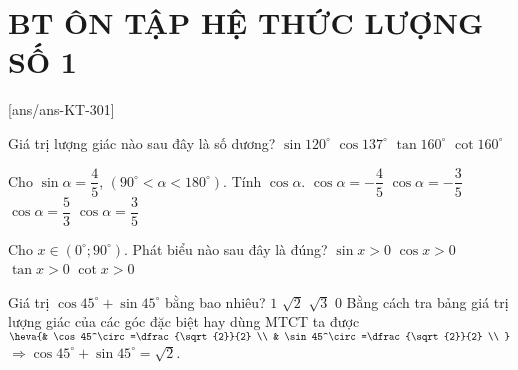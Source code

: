 \section*{BT ÔN TẬP HỆ THỨC LƯỢNG SỐ 1}
\setcounter{ex}{0}\setcounter{ex}{0}
[ans/ans-KT-301]
\begin{ex} 
	Giá trị lượng giác nào sau đây là số dương?
	\choice
	{\True $\sin 120^\circ$}
	{$\cos 137^\circ$}
	{$\tan 160^\circ$}
	{$\cot 160^\circ$}
\end{ex}
\begin{ex}
	Cho $\sin\alpha=\dfrac{4}{5}$, $\left(90^\circ<\alpha <180^\circ\right)$. Tính $\cos\alpha $.
	\choice
	{$\cos\alpha=-\dfrac{4}{5}$}
	{\True $\cos\alpha=-\dfrac{3}{5}$}
	{$\cos\alpha=\dfrac{5}{3}$}
	{$\cos\alpha=\dfrac{3}{5}$}
\end{ex}
\begin{ex}
	Cho $x\in\left(0^\circ;90^\circ\right)$. Phát biểu nào sau đây là đúng?
	\choice
	{\True $\sin x>0$}
	{$\cos x>0$}
	{$\tan x>0$}
	{$\cot x>0$}
\end{ex}
\begin{ex}
	Giá trị $\cos 45^\circ+\sin 45^\circ$ bằng bao nhiêu?
	\choice
	{$1$}
	{\True $\sqrt{2}$}
	{$\sqrt{3}$}
	{$0$}
	\loigiai
	{Bằng cách tra bảng giá trị lượng giác của các góc đặc biệt hay dùng MTCT ta được $\heva{& \cos 45^\circ=\dfrac{\sqrt{2}}{2} \\ 
			& \sin 45^\circ=\dfrac{\sqrt{2}}{2} \\ 
		}$\\
		$\Rightarrow \cos 45^\circ+\sin 45^\circ=\sqrt{2}$.}
\end{ex}
